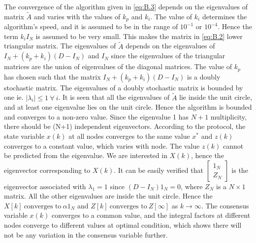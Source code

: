  The convergence of the algorithm given in \eqref{eq:B.3} depends on the eigenvalues of matrix $\tilde{A}$ and varies with the values of $k_p$ and $k_i$. The value of $k_i$ determines the algorithm's speed, and it is assumed to be in the range of $10^{-1}$ or $10^{-4}$. Hence the term $k_iI_N$ is assumed to be very small. This makes the matrix in \eqref{eq:B.2} lower triangular matrix. The eigenvalues of $\tilde{A}$ depends on the eigenvalues of $I_N+(k_p+k_i)(D-I_N)$ and $I_N$ since the eigenvalues of the triangular matrices are the union of eigenvalues of the diagonal matrices. The value of $k_p$ has chosen such that the matrix $I_N+(k_p+k_i)(D-I_N)$ is a doubly stochastic matrix. 
The eigenvalues of a doubly stochastic matrix is bounded by one ie. $|\lambda_i| \leq 1 \ \forall \ i$.
 It is seen that all the eigenvalues of $\tilde{A}$ lie inside the unit circle, and at least one eigenvalue lies on the unit circle. Hence the algorithm is bounded and converges to a non-zero value.
Since the eigenvalue 1 has $N+1$ multiplicity, there should be (N+1) independent eigenvectors. According to the protocol, the state variable $x(k)$ at all nodes converges to the same value $x^*$ and $z(k)$ converges to a constant value, which varies with node. The value $z(k)$ cannot be predicted from the eigenvalue. We are interested in $X(k)$, hence the eigenvector corresponding to $X(k)$. It can be easily verified that $\begin{bmatrix}
	1_N\\
	Z_N
	\end{bmatrix}$ 
is the eigenvector associated with $\lambda_1=1$ since $(D-I_N)1_N=0$, where $Z_N$ is a $N\times1$ matrix. All the other eigenvalues are inside the unit circle. Hence the $X[k] \ \text{converges to}\ \alpha 1_N$ and $Z[k] \ \text{converges to}\ Z[\infty]$ as $k \to \infty$. The consensus variable $x(k)$ converges to a common value, and the integral factors at different nodes converge to different values at optimal condition, which shows there will not be any variation in the consensus variable further.

